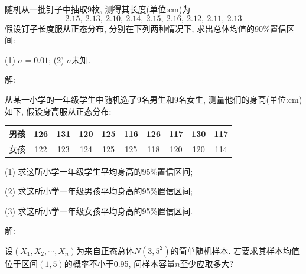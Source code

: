 \documentclass[standard]{ExBook}
\begin{document}
\begin{qitems}
\vspace{-5em}

    \begin{bbox}
    \begin{shaded}
        \qitem
随机从一批钉子中抽取9枚, 测得其长度(单位:cm)为
$$2.15,\ 2.13,\ 2.10,\ 2.14,\ 2.15,\ 2.16,\ 2.12,\ 2.11,\ 2.13$$
假设钉子长度服从正态分布, 分别在下列两种情况下, 求出总体均值的90\%置信区间:

(1) $\sigma=0.01$; \qquad (2) $\sigma$未知.
    \end{shaded}
    \end{bbox}

\vspace{-5em}

    \begin{bbox}
解: 
    \end{bbox}

\vspace{-5em}

    \begin{bbox}
    \begin{shaded}
        \qitem
从某一小学的一年级学生中随机选了9名男生和9名女生, 测量他们的身高(单位:cm)如下, 假设身高服从正态分布:
\begin{center}
\setlength{\tabcolsep}{15pt}
\begin{tabular}{c|ccccccccc}
    \hline
    男孩 & 126 & 131 & 120 & 125 & 116 & 126 & 117 & 130 & 117\\
    \hline
    女孩 & 122 & 123 & 124 & 125 & 125 & 118 & 120 & 120 & 114\\
    \hline
\end{tabular}
\end{center}
(1) 求这所小学一年级学生平均身高的95\%置信区间;

(2) 求这所小学一年级男孩平均身高的95\%置信区间;

(3) 求这所小学一年级女孩平均身高的95\%置信区间.
    \end{shaded}
    \end{bbox}

\vspace{-5em}

    \begin{bbox}
解: 
    \end{bbox}

\vspace{-5em}

    \begin{bbox}
    \begin{shaded}
        \qitem
设$(X_1,X_2,\cdots,X_n)$为来自正态总体$N(3,5^2)$的简单随机样本. 若要求其样本均值位于区间$(1, 5)$的概率不小于0.95, 问样本容量$n$至少应取多大?
    \end{shaded}
    \end{bbox}


\end{qitems}
\end{document}
